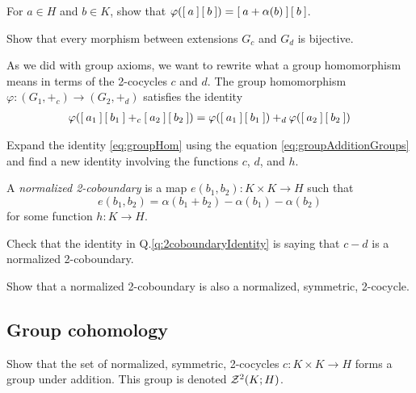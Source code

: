 \begin{qbox}
  For $a \in H$ and $b \in K$, show that $\varphi(\left[\: a \:\right]\left[\: b \:\right]) = \left[\: a + \alpha(b) \:\right]\left[\: b \:\right]$.
\end{qbox}

\begin{qbox}
  Show that every morphism between extensions $G_c$ and $G_d$ is bijective.
\end{qbox}

As we did with group axioms, we want to rewrite what a group homomorphism means in terms of the 2-cocycles $c$ and $d$.
The group homomorphism $\varphi: (G_1,+_c) \rightarrow (G_2,+_d)$ satisfies the identity
\begin{align}
  \label{eq:groupHom}
  \varphi(\left[\: a_1 \:\right]\left[\: b_1 \:\right] +_c \left[\: a_2 \:\right]\left[\: b_2 \:\right]) = \varphi(\left[\: a_1 \:\right]\left[\: b_1 \:\right]) +_d \varphi(\left[\: a_2 \:\right]\left[\: b_2 \:\right])
\end{align}

\begin{qbox}
  \label{q:2coboundaryIdentity}
  Expand the identity \eqref{eq:groupHom} using the equation \eqref{eq:groupAdditionGroups} and find a new identity involving the functions $c$, $d$, and $h$.
\end{qbox}

\begin{definition}
  A \emph{normalized 2-coboundary} is a map $e(b_1,b_2): K \times K \rightarrow H$ such that
  \begin{equation*}
    e(b_1, b_2) = \alpha(b_1 + b_2) - \alpha(b_1) - \alpha(b_2)
  \end{equation*}
  for some function $h:K \rightarrow H$.
\end{definition}

\begin{qbox}
  Check that the identity in Q.\ref{q:2coboundaryIdentity} is saying that $c - d$ is a normalized 2-coboundary.
\end{qbox}

\begin{qbox}
  Show that a normalized 2-coboundary is also a normalized, symmetric, 2-cocycle.
\end{qbox}











\newpage
\subsection{Group cohomology}
\begin{qbox}
  Show that the set of normalized, symmetric, 2-cocycles $c:K \times K \rightarrow H$ forms a group under addition.
  This group is denoted $\mathcal{Z}^2(K;H)$.
\end{qbox}

